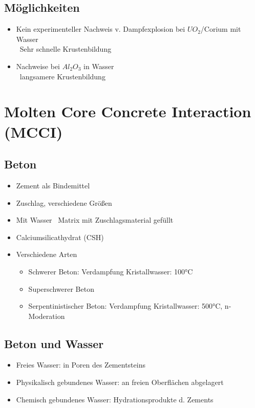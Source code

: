 \documentclass[12pt]{article}
\begin{document}
\subsection{Möglichkeiten}
\begin{itemize}
	\item Kein experimenteller Nachweis v. Dampfexplosion bei \(UO_2\)/Corium mit Wasser\\
		\textrightarrow\ Sehr schnelle Krustenbildung
	\item Nachweise bei \(Al_2O_3\) in Wasser\\
		\textrightarrow\ langsamere Krustenbildung
\end{itemize}

\section{Molten Core Concrete Interaction (MCCI)}

\subsection{Beton}
\begin{itemize}
	\item Zement als Bindemittel
	\item Zuschlag, verschiedene Größen
	\item Mit Wasser \textrightarrow\ Matrix mit Zuschlagsmaterial gefüllt
	\item Calciumsilicathydrat (CSH)
	\item Verschiedene Arten
		\begin{itemize}
			\item Schwerer Beton: Verdampfung Kristallwasser: 100°C
			\item Superschwerer Beton
			\item Serpentinistischer Beton: Verdampfung Kristallwasser: 500°C, n-Moderation
		\end{itemize}
\end{itemize}

\subsection{Beton und Wasser}
\begin{itemize}
	\item Freies Wasser: in Poren des Zementsteins
	\item Physikalisch gebundenes Wasser: an freien Oberflächen abgelagert
	\item Chemisch gebundenes Wasser: Hydrationsprodukte d. Zements
\end{itemize}
\end{document}
